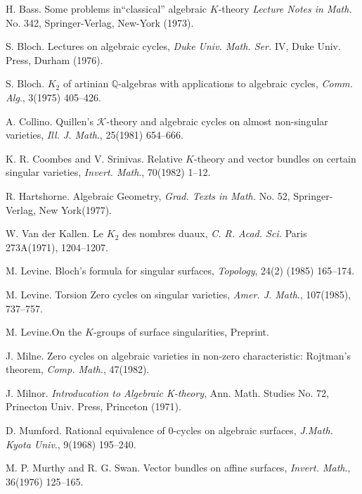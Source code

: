\begin{thebibliography}{ABCDEFGHI}
\pageoriginale
{H. Bass}. Some problems in``classical'' algebraic $K$-theory \textit{Lecture Notes in Math.} No. 342, Springer-Verlag, New-York (1973).

{S. Bloch}. Lectures on algebraic cycles, \textit{Duke Univ. Math. Ser.} IV, Duke Univ. Press, Durham (1976).

{S. Bloch}. $K_2$ of artinian $\mathbb{Q}$-algebras with applications to algebraic cycles, \textit{Comm. Alg}., 3(1975) 405--426.

{A. Collino}. Quillen's $\mathscr{K}$-theory and algebraic cycles on almost non-singular varieties, \textit{Ill. J. Math}., 25(1981) 654--666.

{K. R. Coombes} and V. Srinivas. Relative $K$-theory and vector bundles on certain singular varieties, \textit{Invert. Math}., 70(1982) 1--12.

{R. Hartshorne}. Algebraic Geometry, \textit{Grad. Texts in Math.} No. 52, Springer-Verlag, New York(1977).

{W. Van der Kallen}. Le $K_2$ des nombres duaux, \textit{C. R. Acad. Sci.} Paris 273A(1971), 1204--1207.

{M. Levine}. Bloch's formula for singular surfaces, \textit{Topology},  24(2) (1985) 165--174.

{M. Levine}. Torsion Zero cycles on singular
varieties, \textit{Amer. J. Math}., 107(1985), 737--757. 

{M. Levine}.\pageoriginale On the $K$-groups of surface singularities, Preprint. 

{J. Milne}. Zero cycles on algebraic varieties in non-zero characteristic: Rojtman's theorem, \textit{Comp. Math}., 47(1982).

{J. Milnor}. \textit{Introducation to Algebraic K-theory}, Ann. Math. Studies No. 72, Prinecton Univ. Press, Princeton (1971).

{D. Mumford}. Rational equivalence of $0$-cycles on algebraic surfaces, \textit{J.Math. Kyota Univ}., 9(1968) 195--240.

{M. P. Murthy and R. G. Swan}. Vector bundles on affine surfaces, \textit{Invert. Math}., 36(1976) 125--165.


\end{thebibliography}
